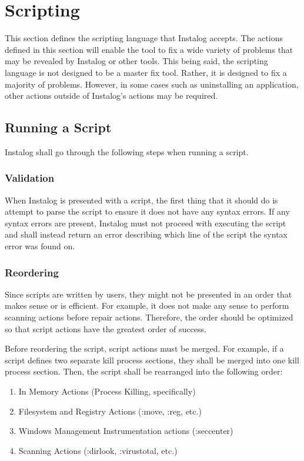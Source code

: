 \section{Scripting}
This section defines the scripting language that Instalog accepts. The actions
defined in this section will enable the tool to fix a wide variety of problems
that may be revealed by Instalog or other tools. This being said, the scripting
language is not designed to be a master fix tool.  Rather, it is designed to fix
a majority of problems.  However, in some cases such as uninstalling an
application, other actions outside of Instalog's actions may be required.

\subsection{Running a Script}
Instalog shall go through the following steps when running a script.  
\subsubsection{Validation}
When Instalog is presented with a script, the first thing that it should do is
attempt to parse the script to ensure it does not have any syntax errors.  If
any syntax errors are present, Instalog must not proceed with executing
the script and shall instead return an error describing which line of the script
the syntax error was found on.
\subsubsection{Reordering}
Since scripts are written by users, they might not be presented in an order that
makes sense or is efficient.  For example, it does not make any sense to
perform scanning actions before repair actions.  Therefore, the order should be
optimized so that script actions have the greatest order of success.

Before reordering the script, script actions must be merged.  For example, if a
script defines two separate kill process sections, they shall be merged into one
kill process section.  Then, the script shall be rearranged into the following
order:
\begin{enumerate}
  \item In Memory Actions (Process Killing, specifically)
  \item Filesystem and Registry Actions (:move, :reg, etc.)
  \item Windows Management Instrumentation actions (:seccenter)
  \item Scanning Actions (:dirlook, :virustotal, etc.)
\end{enumerate}
